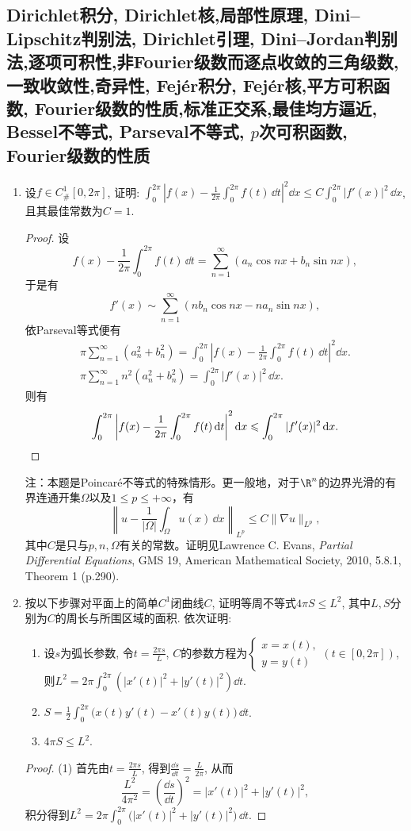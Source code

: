 \subsection{Dirichlet积分, Dirichlet核,局部性原理, Dini--Lipschitz判别法, Dirichlet引理, Dini--Jordan判别法,逐项可积性,非Fourier级数而逐点收敛的三角级数,一致收敛性,奇异性, Fej\'{e}r积分, Fej\'{e}r核,平方可积函数, Fourier级数的性质,标准正交系,最佳均方逼近, Bessel不等式, Parseval不等式, \(p\)次可积函数, Fourier级数的性质}
\begin{quiza}
\begin{enumerate}
\item 设\(f\in C_{\#}^1[0,2\pi]\), 证明: \(\int_{0}^{2\pi}\left|f(x)-\frac{1}{2\pi}\int_{0}^{2\pi}f(t)\,\dd t\right|^2\dd x\leqslant C\int_{0}^{2\pi}|f'(x)|^2\,\dd x\), 且其最佳常数为\(C=1\).
\begin{proof}
设\[f(x)-\frac{1}{2\pi}\int_{0}^{2\pi}f(t)\,\dd t=\sum_{n=1}^{\infty}\left(a_n\cos nx+b_n\sin nx\right),\]
于是有\[f'(x)\sim\sum_{n=1}^{\infty}\left(nb_n\cos nx-na_n\sin nx\right),\]
依Parseval等式便有\begin{gather*}
\pi\sum_{n=1}^{\infty}\left(a_n^2+b_n^2\right)=\int_{0}^{2\pi}\left|f(x)-\frac{1}{2\pi}\int_{0}^{2\pi}f(t)\,\dd t\right|^2\dd x.\\
\pi\sum_{n=1}^{\infty}n^2\left(a_n^2+b_n^2\right)=\int_{0}^{2\pi}|f'(x)|^2\,\dd x.
\end{gather*}
则有\[\int_{0}^{2\pi}\left|f(x)-\frac{1}{2\pi}\int_{0}^{2\pi}f(t)\,{\rm d} t\right|^2{\rm d} x
\leqslant \int_{0}^{2\pi}|f'(x)|^2\,{\rm d} x.\qedhere\]
\end{proof}
注：本题是Poincaré不等式的特殊情形。更一般地，对于$\R^n$的边界光滑的有界连通开集$\varOmega$以及$1 \leqslant p \leqslant +\infty$，有
\[\left\|u-\frac{1}{|\varOmega|}\int_\varOmega u(x)\,\dd x\right\|_{L^p} \leqslant C\|\nabla u\|_{L^p},\]
其中$C$是只与$p,n,\varOmega$有关的常数。证明见Lawrence C. Evans, \textit{Partial Differential Equations}, 
GMS 19, American Mathematical Society, 2010, 5.8.1, Theorem 1 (p.290).

\item 按以下步骤对平面上的简单\(C^1\)闭曲线\(C\), 证明等周不等式\(4\pi S\leqslant L^2\), 其中\(L,S\)分别为\(C\)的周长与所围区域的面积. 依次证明:
\begin{enumerate}[label=(\arabic*)]
\item 设\(s\)为弧长参数, 令\(t=\frac{2\pi s}{L}\), \(C\)的参数方程为\(\begin{cases}
x=x(t),\\y=y(t)
\end{cases}(t\in [0,2\pi])\), 则\(L^2=2\pi\int_{0}^{2\pi}\left(|x'(t)|^2+|y'(t)|^2\right)\dd t.\)
\item \(S=\frac{1}{2}\int_{0}^{2\pi}\big(x(t)y'(t)-x'(t)y(t)\big)\,\dd t\).
\item \(4\pi S\leqslant L^2\).
\end{enumerate}
\begin{proof}
(1) 首先由\(t=\frac{2\pi s}{L}\), 得到\(\frac{\dd s}{\dd t}=\frac{L}{2\pi}\), 从而
\[\frac{L^2}{4\pi^2}=\left(\frac{\dd s}{\dd t}\right)^2
=\left|x'(t)\right|^2+\left|y'(t)\right|^2,\]
积分得到\(L^2=2\pi\int_{0}^{2\pi}\big(|x'(t)|^2+|y'(t)|^2\big)\,\dd t\).


\end{proof}
\end{enumerate}
\end{quiza}
